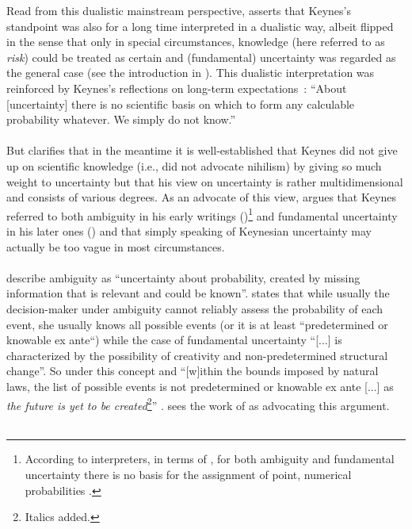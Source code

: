 \documentclass[a4paper,12pt,oneside,pointednumbers,bibtotoc,bigheadings,liststotoc]{scrbook}
\begin{document}
Read from this dualistic mainstream perspective, \citet{dow:16} asserts that Keynes's standpoint was also for a long time interpreted in a dualistic way, albeit flipped in the sense that only in special circumstances, knowledge (here referred to as \textit{risk}) could be treated as certain and (fundamental) uncertainty was regarded as the general case (see the introduction in \citealp{keynes:21}). This dualistic interpretation was reinforced by Keynes's reflections on long-term expectations~\citep[p. 214/214]{keynes:37}: 
``About [uncertainty] there is no scientific basis on which to form any calculable probability whatever. We simply do not know.''\\
\\
But \citet{dow:16} clarifies that in the meantime it is well-established that Keynes did not give up on scientific knowledge (i.e., did not advocate nihilism) by giving so much weight to uncertainty but that his view on uncertainty is rather multidimensional and consists of various degrees. As an advocate of this view, \citet{dequesh:00} argues that Keynes referred to both ambiguity in his early writings (\citealp{keynes:21})\footnote{According to interpreters, in terms of \citet{keynes:21}, for both ambiguity and fundamental uncertainty there is no basis for the assignment of point, numerical probabilities \citep{dequesh:00}.} and fundamental uncertainty in his later ones (\citealp{keynes:37}) and that simply speaking of Keynesian uncertainty may actually be too vague in most circumstances. \\
\\
\citet[p. 330]{camererandweber:92} describe ambiguity as ``uncertainty about probability, created by missing information that is relevant and could be known''. \citet[p. 623]{dequech:14} states that while usually the decision-maker under ambiguity cannot reliably assess the probability of each event, she usually knows all possible events (or it is at least ``predetermined or knowable ex ante``) while the case of fundamental uncertainty ``[...] is characterized by the possibility of creativity and non-predetermined structural change''. So under this concept and ``[w]ithin the bounds imposed by natural laws, the list of possible events is not predetermined or knowable ex ante [...] as \textit{the future is yet to be created}\footnote{Italics added.}'' \citep[p. 623]{dequech:14}. \citet{dequesh:00} sees the work of \citet{shackle:72} as advocating this argument.\\
\\
\end{document}
